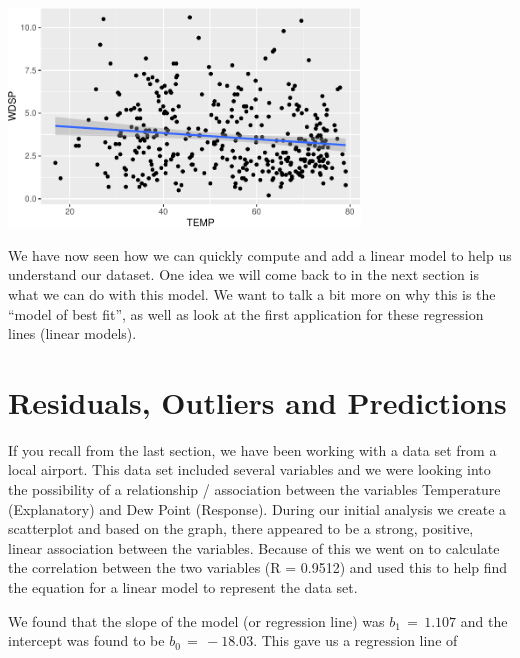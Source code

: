 \documentclass[
  letterpaper,
  DIV=11,
  numbers=noendperiod]{scrreprt}
\begin{document}
\begin{center}
\includegraphics[width=0.7\textwidth,height=\textheight]{Linear_Modeling_and_Regression_files/figure-pdf/unnamed-chunk-15-1.pdf}
\end{center}

We have now seen how we can quickly compute and add a linear model to
help us understand our dataset. One idea we will come back to in the
next section is what we can do with this model. We want to talk a bit
more on why this is the ``model of best fit'', as well as look at the
first application for these regression lines (linear models).


\chapter*{Residuals, Outliers and
Predictions}\label{residuals-outliers-and-predictions}


If you recall from the last section, we have been working with a data
set from a local airport. This data set included several variables and
we were looking into the possibility of a relationship / association
between the variables Temperature (Explanatory) and Dew Point
(Response). During our initial analysis we create a scatterplot and
based on the graph, there appeared to be a strong, positive, linear
association between the variables. Because of this we went on to
calculate the correlation between the two variables (R = 0.9512) and
used this to help find the equation for a linear model to represent the
data set.

We found that the slope of the model (or regression line) was
\(b_1 \,= \,1.107\) and the intercept was found to be
\(b_0\, = \,-18.03\). This gave us a regression line of
\end{document}
